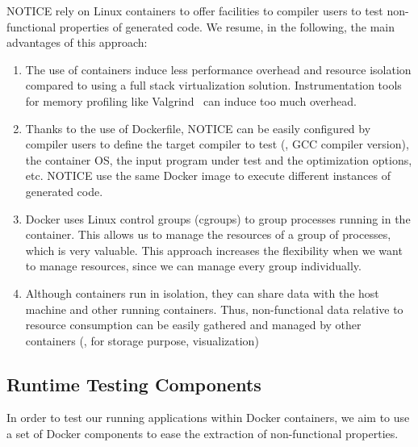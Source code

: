 NOTICE rely on Linux containers to offer facilities to compiler users to test non-functional properties of generated code. We resume, in the following, the main advantages of this approach:
\begin{enumerate}
	\item The use of containers induce less performance overhead and resource isolation compared to using a full stack virtualization solution. Instrumentation tools for memory profiling like Valgrind~\cite{nethercote2007valgrind} can induce too much overhead.
	\item Thanks to the use of Dockerfile, NOTICE can be easily configured by compiler users to define the target compiler to test (\eg, GCC compiler version), the container OS, the input program under test and the optimization options, etc. NOTICE use the same Docker image to execute different instances of generated code.
	\item Docker uses Linux control groups (cgroups) to group processes running in the container. This allows us to manage the resources of a group of processes, which is very valuable. 
	This approach increases the flexibility when we want to manage resources, since we can manage every group individually. 
	\item Although containers run in isolation, they can share data with the host machine and other running containers. Thus, non-functional data relative to resource consumption can be easily gathered and managed by other containers (\eg, for storage purpose, visualization)
\end{enumerate}


\subsection{Runtime Testing Components}
In order to test our running applications within Docker containers, we aim to use a set of Docker components to ease the extraction of non-functional properties.
